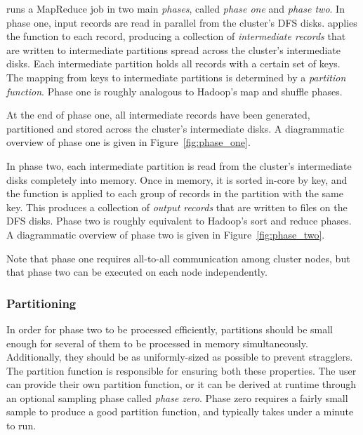 \themis runs a MapReduce job in two main \emph{phases}, called \emph{phase one}
and \emph{phase two}.  In phase one, input records are read in parallel from
the cluster's DFS disks. \themis applies the \map function to each record,
producing a collection of \emph{intermediate records} that are written to
intermediate partitions spread across the cluster's intermediate disks. Each
intermediate partition holds all records with a certain set of keys. The
mapping from keys to intermediate partitions is determined by a \emph{partition
  function}. Phase one is roughly analogous to Hadoop's map and shuffle phases.

At the end of phase one, all intermediate records have been generated,
partitioned and stored across the cluster's intermediate disks. A diagrammatic
overview of phase one is given in Figure~\ref{fig:phase_one}.

In phase two, each intermediate partition is read from the cluster's
intermediate disks completely into memory. Once in memory, it is sorted in-core
by key, and the \reduce function is applied to each group of records in the
partition with the same key. This produces a collection of \emph{output
  records} that are written to files on the DFS disks. Phase two is roughly
equivalent to Hadoop's sort and reduce phases. A diagrammatic overview of phase
two is given in Figure~\ref{fig:phase_two}.

Note that phase one requires all-to-all communication among cluster nodes, but
that phase two can be executed on each node independently.

\subsubsection{Partitioning}

In order for phase two to be processed efficiently, partitions should be small
enough for several of them to be processed in memory
simultaneously. Additionally, they should be as uniformly-sized as possible to
prevent stragglers. The partition function is responsible for ensuring both
these properties. The user can provide their own partition function, or it can
be derived at runtime through an optional sampling phase called \emph{phase
  zero}. Phase zero requires a fairly small sample to produce a good partition
function, and typically takes under a minute to run.
